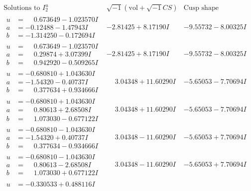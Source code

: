 \documentclass[1p]{elsarticle_modified}
\theoremstyle{definition}
\newcommand{\I}{\sqrt{-1}}
\begin{document}
$$\begin{array}{c|c|c}
\text{Solutions to }I^u_{2}& \I (\text{vol} + \sqrt{-1}CS) & \text{Cusp shape}\\
 \hline 
\begin{aligned}
u &= \phantom{-}0.673649 - 1.023570 I \\
a &= -0.12488 - 1.47943 I \\
b &= -1.314250 - 0.172694 I\end{aligned}
 & -2.81425 + 8.17190 I & -9.55732 - 8.00325 I \\ \hline\begin{aligned}
u &= \phantom{-}0.673649 - 1.023570 I \\
a &= \phantom{-}0.29874 + 3.07399 I \\
b &= \phantom{-}0.942920 - 0.509265 I\end{aligned}
 & -2.81425 + 8.17190 I & -9.55732 - 8.00325 I \\ \hline\begin{aligned}
u &= -0.680810 + 1.043630 I \\
a &= -1.54320 - 0.40737 I \\
b &= \phantom{-}0.377634 + 0.934666 I\end{aligned}
 & \phantom{-}3.04348 + 11.60290 I & -5.65053 - 7.70694 I \\ \hline\begin{aligned}
u &= -0.680810 + 1.043630 I \\
a &= \phantom{-}0.80613 + 2.68508 I \\
b &= \phantom{-}1.073030 - 0.677122 I\end{aligned}
 & \phantom{-}3.04348 + 11.60290 I & -5.65053 - 7.70694 I \\ \hline\begin{aligned}
u &= -0.680810 - 1.043630 I \\
a &= -1.54320 + 0.40737 I \\
b &= \phantom{-}0.377634 - 0.934666 I\end{aligned}
 & \phantom{-}3.04348 - 11.60290 I & -5.65053 + 7.70694 I \\ \hline\begin{aligned}
u &= -0.680810 - 1.043630 I \\
a &= \phantom{-}0.80613 - 2.68508 I \\
b &= \phantom{-}1.073030 + 0.677122 I\end{aligned}
 & \phantom{-}3.04348 - 11.60290 I & -5.65053 + 7.70694 I \\ \hline\begin{aligned}
u &= -0.330533 + 0.488116 I \\

\end{aligned}
\end{array}$$
\end{document}
